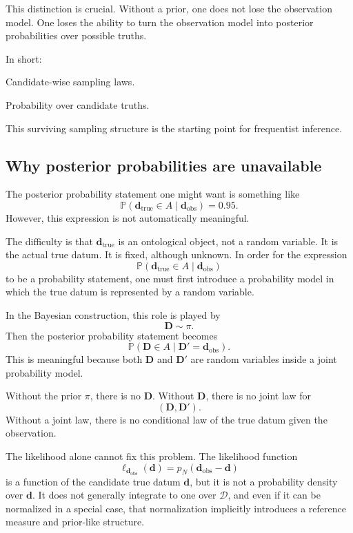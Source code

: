 \documentclass[11pt]{article}
\newcommand{\Dspace}{\mathcal D}
\newcommand{\prior}{\pi}
\newcommand{\Drand}{\mathbf D}
\newcommand{\Dobsrand}{\mathbf D'}
\newcommand{\dtrue}{\mathbf d_{\mathrm{true}}}
\newcommand{\dobs}{\mathbf d_{\mathrm{obs}}}
\newcommand{\Prob}{\mathbb P}
\begin{document}
This distinction is crucial. Without a prior, one does not lose the observation model. One loses the ability to turn the observation model into posterior probabilities over possible truths.

In short:
\begin{description}[leftmargin=3.2cm,style=nextline]
    \item[Survives.]
    Candidate-wise sampling laws.

    \item[Collapses.]
    Probability over candidate truths.
\end{description}

This surviving sampling structure is the starting point for frequentist inference.

\subsection{Why posterior probabilities are unavailable}

The posterior probability statement one might want is something like
\[
    \Prob(\dtrue\in A\mid \dobs)=0.95.
\]
However, this expression is not automatically meaningful.

The difficulty is that \(\dtrue\) is an ontological object, not a random variable. It is the actual true datum. It is fixed, although unknown. In order for the expression
\[
    \Prob(\dtrue\in A\mid \dobs)
\]
to be a probability statement, one must first introduce a probability model in which the true datum is represented by a random variable.

In the Bayesian construction, this role is played by
\[
    \Drand\sim\prior.
\]
Then the posterior probability statement becomes
\[
    \Prob(\Drand\in A\mid \Dobsrand=\dobs).
\]
This is meaningful because both \(\Drand\) and \(\Dobsrand\) are random variables inside a joint probability model.

Without the prior \(\prior\), there is no \(\Drand\). Without \(\Drand\), there is no joint law for
\[
    (\Drand,\Dobsrand).
\]
Without a joint law, there is no conditional law of the true datum given the observation.

The likelihood alone cannot fix this problem. The likelihood function
\[
    \ell_{\dobs}(\mathbf d)
    =
    p_N(\dobs-\mathbf d)
\]
is a function of the candidate true datum \(\mathbf d\), but it is not a probability density over \(\mathbf d\). It does not generally integrate to one over \(\Dspace\), and even if it can be normalized in a special case, that normalization implicitly introduces a reference measure and prior-like structure.
\end{document}
